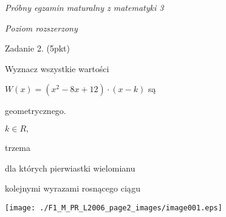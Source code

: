 \documentclass[a4paper,12pt]{article}
\begin{document}
{\it Próbny egzamin maturalny z matematyki 3}

{\it Poziom rozszerzony}

Zadanie 2. (5pkt)

Wyznacz wszystkie wartości

$W(x)=(x^{2}-8x+12)\cdot(x-k)$ są

geometrycznego.

$k\in R,$

trzema

dla których pierwiastki wielomianu

kolejnymi wyrazami rosnącego ciągu
\begin{center}
\texttt{[image: ./F1\_M\_PR\_L2006\_page2\_images/image001.eps]}
\end{center}
\end{document}
